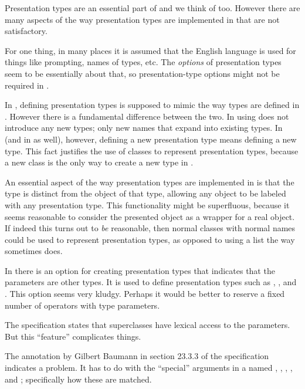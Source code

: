 Presentation types are an essential part of \climtwo{} and we think of
\clim{} too.  However there are many aspects of the way presentation
types are implemented in \climtwo{} that are not satisfactory. 

For one thing, in many places it is assumed that the English language
is used for things like prompting, names of types, etc.  The
\emph{options} of presentation types seem to be essentially about
that, so presentation-type options might not be required in \clim{}.  

In \climtwo{}, defining presentation types is supposed to mimic the
way types are defined in \cl{}.  However there is a fundamental
difference between the two.  In \cl{} using  does not
introduce any new types; only new names that expand into existing
types.  In \climtwo{} (and in \clim{} as well), however, defining a
new presentation type means defining a new type.  This fact justifies
the use of classes to represent presentation types, because a new
class is the only way to create a new type in \cl{}.  

An essential aspect of the way presentation types are implemented in
\climtwo{} is that the type is distinct from the object of that type,
allowing any \cl{} object to be labeled with any presentation type.
This functionality might be superfluous, because it seems reasonable
to consider the presented object as a wrapper for a real object.  If
indeed this turns out to \emph{be} reasonable, then normal \cl{}
classes with normal names could be used to represent presentation
types, as opposed to using a list the way \climtwo{} sometimes does.  

In \climtwo{} there is an option for creating presentation types that
indicates that the parameters are other types.  It is used to define
presentation types such as , , and
.  This option seems very kludgy.  Perhaps it would be
better to reserve a fixed number of operators with type parameters. 

The \climtwo{} specification states that superclasses have lexical
access to the parameters.  But this ``feature'' complicates things. 

The annotation by Gilbert Baumann in section 23.3.3 of the \climtwo{}
specification indicates a problem.  It has to do with the ``special''
arguments in a  named
, , , ,
and ; specifically how these are matched.  

